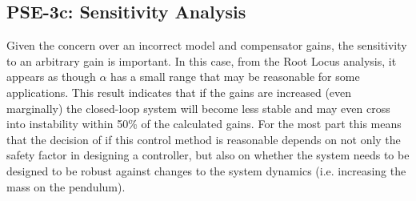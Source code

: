 \documentclass[]{article}
\begin{document}
	\subsection{PSE-3c: Sensitivity Analysis}
		Given the concern over an incorrect model and compensator gains, the sensitivity to an arbitrary gain is important. In this case, from the Root Locus analysis, it appears as though $\alpha$ has a small range that may be reasonable for some applications. This result indicates that if the gains are increased (even marginally) the closed-loop system will become less stable and may even cross into instability within 50\% of the calculated gains. For the most part this means that the decision of if this control method is reasonable depends on not only the safety factor in designing a controller, but also on whether the system needs to be designed to be robust against changes to the system dynamics (i.e. increasing the mass on the pendulum).
		
	\newpage
\end{document}
